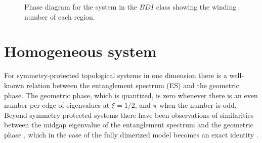 \documentclass[prb,twocolumn,amsmath,amssymb,superscriptaddress]{revtex4-1}
\begin{document}
\begin{figure}[h!]
\centering
{}
\caption{Phase diagram for the system in the $BDI$ class showing the winding number of each region.}
\label{bdi_phase_diagram}
\end{figure}


\section{Homogeneous system}

For symmetry-protected topological systems in one dimension there is a well-known relation between the entanglement spectrum  (ES) and the geometric phase. The geometric phase, which is quantized, is zero whenever there is an even number per edge of eigenvalues at $\xi = 1/2$, and $\pi$ when the number is odd. Beyond symmetry protected systems there have been observations of similarities between the midgap eigenvalue of the entanglement spectrum and the geometric phase \cite{Ryu2006,Huang2012,Huang2012-2}, which in the case of the fully dimerized model becomes an exact identity \cite{Ryu2006}. 
\end{document}
